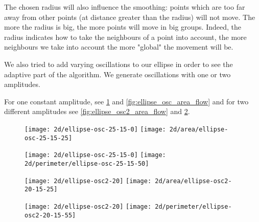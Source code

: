 The chosen radius will also influence the smoothing: points which are too far
away from other points (at distance greater than the radius) will not move. The
more the radius is big, the more points will move in big groups. Indeed, the
radius indicates how to take the neighbours of a point into account, the more
neighbours we take into account the more "global" the movement will be.

We also tried to add varying oscillations to our ellipse in order to see the
adaptive part of the algorithm. We generate oscillations with one or two
amplitudes.

For one constant amplitude, see \ref{fig:ellipse_osc_perimeter_flow} and
\ref{fig:ellipse_osc_area_flow} and for two different amplitudes see
\ref{fig:ellipse_osc2_area_flow} and \ref{fig:ellipse_osc2_perimeter_flow}.

\begin{figure}[h]
    \centering

    \texttt{[image: 2d/ellipse-osc-25-15-0]}
    \texttt{[image: 2d/area/ellipse-osc-25-15-25]}
    \label{fig:ellipse_osc_area_flow}

    \texttt{[image: 2d/ellipse-osc-25-15-0]}
    \texttt{[image: 2d/perimeter/ellipse-osc-25-15-50]}
    \label{fig:ellipse_osc_perimeter_flow}
\end{figure}

\begin{figure}[h]
    \centering

    \texttt{[image: 2d/ellipse-osc2-20]}
    \texttt{[image: 2d/area/ellipse-osc2-20-15-25]}
    \label{fig:ellipse_osc2_area_flow}

    \texttt{[image: 2d/ellipse-osc2-20]}
    \texttt{[image: 2d/perimeter/ellipse-osc2-20-15-55]}
    \label{fig:ellipse_osc2_perimeter_flow}
\end{figure}

